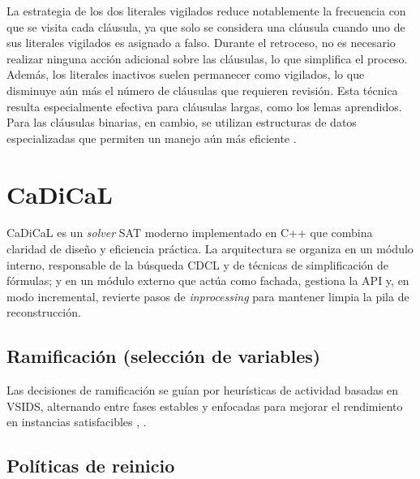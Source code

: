 
La estrategia de los dos literales vigilados reduce notablemente la frecuencia con que se visita cada cláusula, ya que solo se considera una cláusula cuando uno de sus literales vigilados es asignado a falso. Durante el retroceso, no es necesario realizar ninguna acción adicional sobre las cláusulas, lo que simplifica el proceso. Además, los literales inactivos suelen permanecer como vigilados, lo que disminuye aún más el número de cláusulas que requieren revisión. Esta técnica resulta especialmente efectiva para cláusulas largas, como los lemas aprendidos. Para las cláusulas binarias, en cambio, se utilizan estructuras de datos especializadas que permiten un manejo aún más eficiente \cite{oliveras2009dpll_cdcl}.


\section{CaDiCaL}
\label{sec:cadical}

CaDiCaL es un \textit{solver} SAT moderno implementado en C++ que combina claridad de diseño y eficiencia práctica. La arquitectura se organiza en un módulo interno, responsable de la búsqueda CDCL y de técnicas de simplificación de fórmulas; y en un módulo externo que actúa como fachada, gestiona la API y, en modo incremental, revierte pasos de \textit{inprocessing} para mantener limpia la pila de reconstrucción.

\subsection{Ramificaci\'on (selecci\'on de variables)}
Las decisiones de ramificación se guían por heurísticas de actividad basadas en VSIDS, alternando entre fases estables y enfocadas para mejorar el rendimiento en instancias satisfacibles \cite{iser2021unit}, \cite{cherif2021combining}.


\subsection{Políticas de reinicio}
\label{subsec:cadical-restart}

